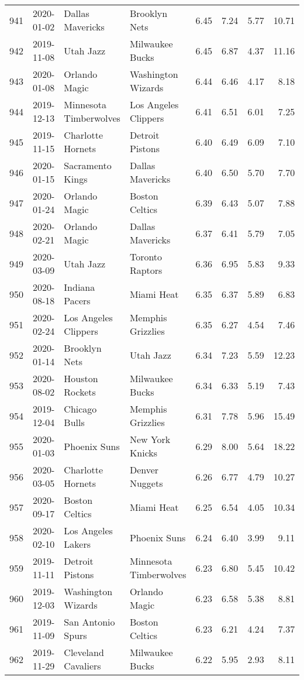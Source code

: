 \documentclass[
  11pt,
]{article}
\theoremstyle{nonumberplain}
\begin{document}
\begin{longtable}{rl|llr|rrr}
941 & 2020-01-02 & Dallas Mavericks & Brooklyn Nets & 6.45 & 7.24 & 5.77 & 10.71\\
942 & 2019-11-08 & Utah Jazz & Milwaukee Bucks & 6.45 & 6.87 & 4.37 & 11.16\\
943 & 2020-01-08 & Orlando Magic & Washington Wizards & 6.44 & 6.46 & 4.17 & 8.18\\
944 & 2019-12-13 & Minnesota Timberwolves & Los Angeles Clippers & 6.41 & 6.51 & 6.01 & 7.25\\
945 & 2019-11-15 & Charlotte Hornets & Detroit Pistons & 6.40 & 6.49 & 6.09 & 7.10\\
946 & 2020-01-15 & Sacramento Kings & Dallas Mavericks & 6.40 & 6.50 & 5.70 & 7.70\\
947 & 2020-01-24 & Orlando Magic & Boston Celtics & 6.39 & 6.43 & 5.07 & 7.88\\
948 & 2020-02-21 & Orlando Magic & Dallas Mavericks & 6.37 & 6.41 & 5.79 & 7.05\\
949 & 2020-03-09 & Utah Jazz & Toronto Raptors & 6.36 & 6.95 & 5.83 & 9.33\\
950 & 2020-08-18 & Indiana Pacers & Miami Heat & 6.35 & 6.37 & 5.89 & 6.83\\
951 & 2020-02-24 & Los Angeles Clippers & Memphis Grizzlies & 6.35 & 6.27 & 4.54 & 7.46\\
952 & 2020-01-14 & Brooklyn Nets & Utah Jazz & 6.34 & 7.23 & 5.59 & 12.23\\
953 & 2020-08-02 & Houston Rockets & Milwaukee Bucks & 6.34 & 6.33 & 5.19 & 7.43\\
954 & 2019-12-04 & Chicago Bulls & Memphis Grizzlies & 6.31 & 7.78 & 5.96 & 15.49\\
955 & 2020-01-03 & Phoenix Suns & New York Knicks & 6.29 & 8.00 & 5.64 & 18.22\\
956 & 2020-03-05 & Charlotte Hornets & Denver Nuggets & 6.26 & 6.77 & 4.79 & 10.27\\
957 & 2020-09-17 & Boston Celtics & Miami Heat & 6.25 & 6.54 & 4.05 & 10.34\\
958 & 2020-02-10 & Los Angeles Lakers & Phoenix Suns & 6.24 & 6.40 & 3.99 & 9.11\\
959 & 2019-11-11 & Detroit Pistons & Minnesota Timberwolves & 6.23 & 6.80 & 5.45 & 10.42\\
960 & 2019-12-03 & Washington Wizards & Orlando Magic & 6.23 & 6.58 & 5.38 & 8.81\\
961 & 2019-11-09 & San Antonio Spurs & Boston Celtics & 6.23 & 6.21 & 4.24 & 7.37\\
962 & 2019-11-29 & Cleveland Cavaliers & Milwaukee Bucks & 6.22 & 5.95 & 2.93 & 8.11\\

\end{longtable}
\end{document}
